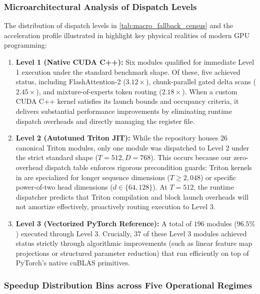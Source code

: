 \subsubsection{Microarchitectural Analysis of Dispatch Levels}
\label{sec:results_dispatch_mechanisms}

The distribution of dispatch levels in \cref{tab:macro_fallback_census} and the acceleration profile illustrated in  highlight key physical realities of modern GPU programming:
\begin{enumerate}
    \item \textbf{Level 1 (Native CUDA C++):} Six modules qualified for immediate Level 1 execution under the standard benchmark shape. Of these, five achieved \passfast{} status, including FlashAttention-2 ($3.12\times$), chunk-parallel gated delta scans ($2.45\times$), and mixture-of-experts token routing ($2.18\times$). When a custom CUDA C++ kernel satisfies its launch bounds and occupancy criteria, it delivers substantial performance improvements by eliminating runtime dispatch overheads and directly managing the register file.
    \item \textbf{Level 2 (Autotuned Triton JIT):} While the repository houses $26$ canonical Triton modules, only one module was dispatched to Level 2 under the strict standard shape ($T=512, D=768$). This occurs because our zero-overhead dispatch table enforces rigorous precondition guards: Triton kernels in \neuralops{} are specialized for longer sequence dimensions ($T \ge 2{,}048$) or specific power-of-two head dimensions ($d \in \{64, 128\}$). At $T=512$, the runtime dispatcher predicts that Triton compilation and block launch overheads will not amortize effectively, proactively routing execution to Level 3.
    \item \textbf{Level 3 (Vectorized PyTorch Reference):} A total of $196$ modules ($96.5\%$) executed through Level 3. Crucially, $37$ of these Level 3 modules achieved \passfast{} status strictly through algorithmic improvements (such as linear feature map projections or structured parameter reduction) that run efficiently on top of PyTorch's native cuBLAS primitives.
\end{enumerate}

\subsubsection{Speedup Distribution Bins across Five Operational Regimes}
\label{sec:results_speedup_bins}

